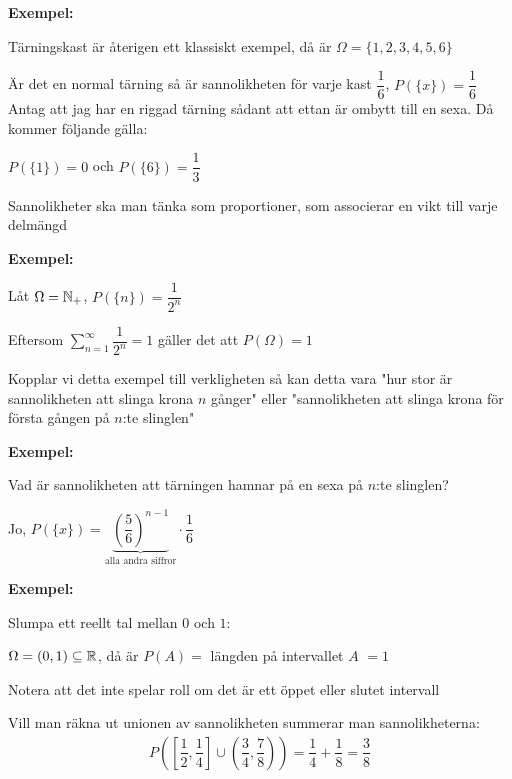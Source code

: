 \par\bigskip
\noindent\textbf{Exempel:}
\par\bigskip
\noindent Tärningskast är återigen ett klassiskt exempel, då är $\Omega = \{1,2,3,4,5,6\}$
\par\bigskip
\noindent Är det en normal tärning så är sannolikheten för varje kast $\dfrac{1}{6}$, $P(\{x\}) = \dfrac{1}{6}$
\newpage
\noindent Antag att jag har en riggad tärning sådant att ettan är ombytt till en sexa. Då kommer följande gälla:\par
\noindent $P(\{1\}) = 0$ och $P(\{6\}) = \dfrac{1}{3}$
\par\bigskip
\noindent Sannolikheter ska man tänka som proportioner, som associerar en vikt till varje delmängd
\par\bigskip
\noindent\textbf{Exempel:}
\par\bigskip
\noindent Låt $\Omega = \mathbb{N}_+$, $P(\{n\}) = \dfrac{1}{2^n}$
\par\bigskip
\noindent Eftersom $\sum_{n=1}^{\infty}\dfrac{1}{2^n}=1$ gäller det att $P(\Omega) = 1$
\par\bigskip
\noindent Kopplar vi detta exempel till verkligheten så kan detta vara "hur stor är sannolikheten att slinga krona $n$ gånger" eller "sannolikheten att slinga krona för första gången på $n$:te slinglen"
\par\bigskip
\noindent\textbf{Exempel:}
\par\bigskip
\noindent Vad är sannolikheten att tärningen hamnar på en sexa på $n$:te slinglen?\par
\noindent Jo, $P(\{x\}) = \underbrace{\left(\dfrac{5}{6}\right)^{n-1}}_{\text{alla andra siffror}}\cdot\dfrac{1}{6}$
\par\bigskip
\noindent\textbf{Exempel:}
\par\bigskip
\noindent Slumpa ett reellt tal mellan $0$ och $1$:\par
\noindent $\Omega = (0,1)\subseteq\mathbb{R}$, då är $P(A) = $ längden på intervallet $A$ $= 1$
\par\bigskip
\noindent Notera att det inte spelar roll om det är ett öppet eller slutet intervall
\par\bigskip
\noindent Vill man räkna ut unionen av sannolikheten summerar man sannolikheterna:
\begin{equation*}
  \begin{gathered}
    P\left(\left[\dfrac{1}{2},\dfrac{1}{4}\right]\cup\left(\dfrac{3}{4},\dfrac{7}{8}\right)\right) = \dfrac{1}{4}+\dfrac{1}{8} = \dfrac{3}{8}
  \end{gathered}
\end{equation*}
